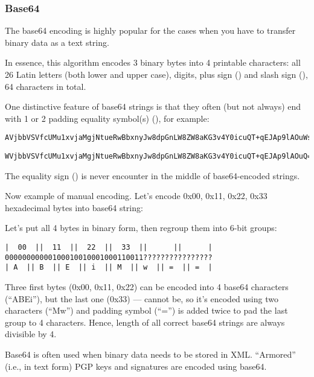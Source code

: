 \subsubsection{Base64}

The base64 encoding is highly popular for the cases when you have to transfer binary data as a text string.

In essence, this algorithm encodes 3 binary bytes into 4 printable characters:
all 26 Latin letters (both lower and upper case), digits, plus sign (\q{+}) and slash sign (\q{/}),
64 characters in total.

One distinctive feature of base64 strings is that they often (but not always) end with 1 or 2 \gls{padding}
equality symbol(s) (\q{=}), for example:

\begin{lstlisting}
AVjbbVSVfcUMu1xvjaMgjNtueRwBbxnyJw8dpGnLW8ZW8aKG3v4Y0icuQT+qEJAp9lAOuWs=
\end{lstlisting}

\begin{lstlisting}
WVjbbVSVfcUMu1xvjaMgjNtueRwBbxnyJw8dpGnLW8ZW8aKG3v4Y0icuQT+qEJAp9lAOuQ==
\end{lstlisting}

The equality sign (\q{=}) is never encounter in the middle of base64-encoded strings.

Now example of manual encoding.
Let's encode 0x00, 0x11, 0x22, 0x33 hexadecimal bytes into base64 string:



Let's put all 4 bytes in binary form, then regroup them into 6-bit groups:

\begin{lstlisting}
|  00  ||  11  ||  22  ||  33  ||      ||      |
00000000000100010010001000110011????????????????
| A  || B  || E  || i  || M  || w  || =  || =  |
\end{lstlisting}

Three first bytes (0x00, 0x11, 0x22) can be encoded into 4 base64 characters (``ABEi''),
but the last one (0x33) --- cannot be,
so it's encoded using two characters (``Mw'') and \gls{padding} symbol (``='')
is added twice to pad the last group to 4 characters.
Hence, length of all correct base64 strings are always divisible by 4.

Base64 is often used when binary data needs to be stored in XML.
``Armored'' (i.e., in text form) PGP keys and signatures are encoded using base64.


